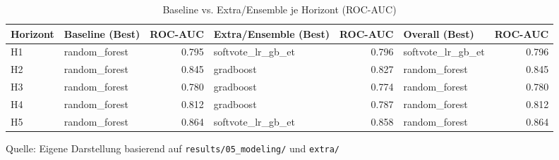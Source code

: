 \begin{table}[H]
  \centering
  \caption{Baseline vs. Extra/Ensemble je Horizont (ROC-AUC)}
  \label{tab:phase05_modeling_comparison}
  \begin{tabular}{l l r l r l r}
    \toprule
    Horizont & Baseline (Best) & ROC-AUC & Extra/Ensemble (Best) & ROC-AUC & Overall (Best) & ROC-AUC \\
    \midrule
    H1 & random\_forest & 0.795 & softvote\_lr\_gb\_et & 0.796 & softvote\_lr\_gb\_et & 0.796 \\
    H2 & random\_forest & 0.845 & gradboost & 0.827 & random\_forest & 0.845 \\
    H3 & random\_forest & 0.780 & gradboost & 0.774 & random\_forest & 0.780 \\
    H4 & random\_forest & 0.812 & gradboost & 0.787 & random\_forest & 0.812 \\
    H5 & random\_forest & 0.864 & softvote\_lr\_gb\_et & 0.858 & random\_forest & 0.864 \\
    \bottomrule
  \end{tabular}
  \par\smallskip
  {\footnotesize Quelle: Eigene Darstellung basierend auf \texttt{results/05\_modeling/} und \texttt{extra/}}
\end{table}
